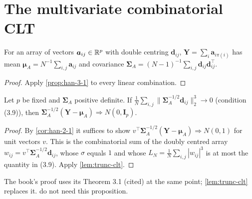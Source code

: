 \section{The multivariate combinatorial CLT}

\begin{proposition}
  \label{prop:han-3-3}
  For an array of vectors $\boldsymbol a_{ij}\in\mathbb{R}^p$ with double centring $\boldsymbol d_{ij}$, $\boldsymbol Y=\sum_i\boldsymbol a_{i\pi(i)}$ has mean $\boldsymbol\mu_A=N^{-1}\sum_{i,j}\boldsymbol a_{ij}$ and covariance $\boldsymbol\Sigma_A=(N-1)^{-1}\sum_{i,j}\boldsymbol d_{ij}\boldsymbol d_{ij}^\top$.
\end{proposition}
\begin{proof}
  Apply \cref{prop:han-3-1} to every linear combination.
\end{proof}

\begin{proposition}
  \label{prop:han-3-4}
  Let $p$ be fixed and $\boldsymbol\Sigma_A$ positive definite. If
  $\frac1N\sum_{i,j}\bigl\|\boldsymbol\Sigma_A^{-1/2}\boldsymbol d_{ij}\bigr\|_2^3\to0$ (condition (3.9)), then $\boldsymbol\Sigma_A^{-1/2}(\boldsymbol Y-\boldsymbol\mu_A)\Rightarrow N(0,\mathbf I_p)$.
\end{proposition}
\begin{proof}
  By \cref{cor:han-2-1} it suffices to show $v^\top\boldsymbol\Sigma_A^{-1/2}(\boldsymbol Y-\boldsymbol\mu_A)\Rightarrow N(0,1)$ for unit vectors $v$. This is the combinatorial sum of the doubly centred array $w_{ij}=v^\top\boldsymbol\Sigma_A^{-1/2}\boldsymbol d_{ij}$, whose $\sigma$ equals $1$ and whose $L_N=\frac1N\sum_{i,j}|w_{ij}|^3$ is at most the quantity in (3.9). Apply \cref{lem:trunc-clt}.
\end{proof}
\begin{remark}
  The book's proof uses its Theorem 3.1 (cited) at the same point; \cref{lem:trunc-clt} replaces it.  do not need this proposition.
\end{remark}
